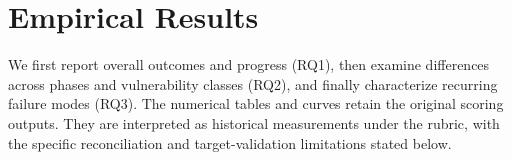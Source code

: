 \section{Empirical Results}
\label{sec:results}
We first report overall outcomes and progress (RQ1), then examine differences across phases and vulnerability classes (RQ2), and finally characterize recurring failure modes (RQ3). The numerical tables and curves retain the original scoring outputs. They are interpreted as historical measurements under the rubric, with the specific reconciliation and target-validation limitations stated below.








